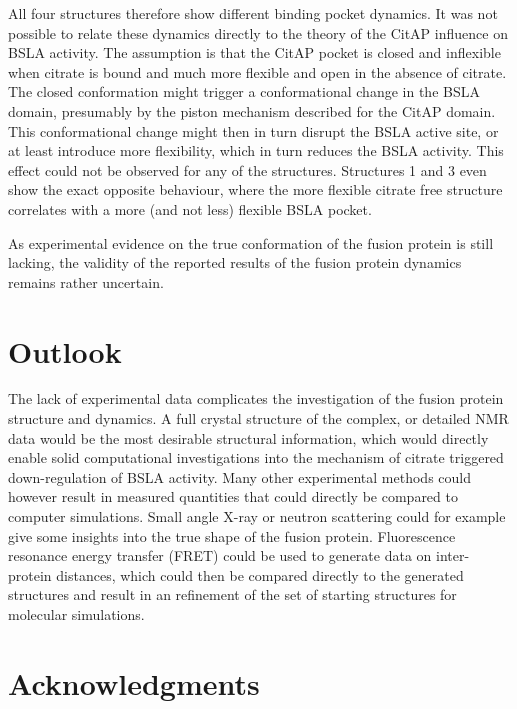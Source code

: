 \documentclass[english, a4paper, 12pt, titlepage, draft]{article}
\begin{document}
All four structures therefore show different binding pocket dynamics.
It was not possible to relate these dynamics directly to the theory of the CitAP influence on BSLA activity.
The assumption is that the CitAP pocket is closed and inflexible when citrate is bound and much more flexible and open in the absence of citrate.
The closed conformation might trigger a conformational change in the BSLA domain, presumably by the piston mechanism described for the CitAP domain.
This conformational change might then in turn disrupt the BSLA active site, or at least introduce more flexibility, which in turn reduces the BSLA activity.
This effect could not be observed for any of the structures.
Structures 1 and 3 even show the exact opposite behaviour, where the more flexible citrate free structure correlates with a more (and not less) flexible BSLA pocket.

As experimental evidence on the true conformation of the fusion protein is still lacking, the validity of the reported results of the fusion protein dynamics remains rather uncertain.



\section{Outlook}

The lack of experimental data complicates the investigation of the fusion protein structure and dynamics.
A full crystal structure of the complex, or detailed NMR data would be the most desirable structural information, which would directly enable solid computational investigations into the mechanism of citrate triggered down-regulation of BSLA activity.
Many other experimental methods could however result in measured quantities that could directly be compared to computer simulations.
Small angle X-ray or neutron scattering could for example give some insights into the true shape of the fusion protein.
Fluorescence resonance energy transfer (FRET) could be used to generate data on inter-protein distances, which could then be compared directly to the generated structures and result in an refinement of the set of starting structures for molecular simulations.



\pagebreak

\section{Acknowledgments}
\end{document}
